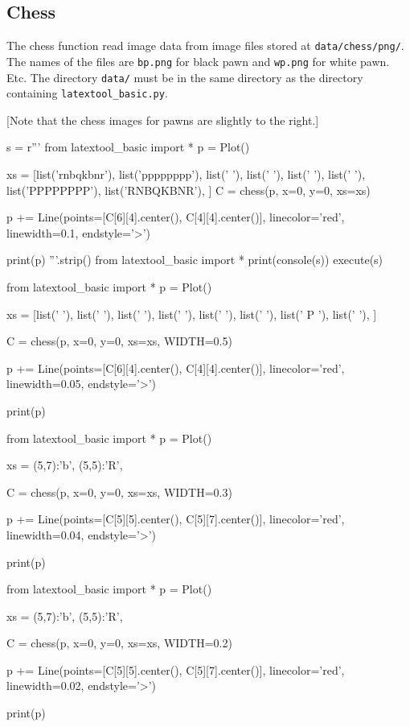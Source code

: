\subsection{Chess}

The chess function read image data from image files stored at
\verb!data/chess/png/!.
The names of the files are \verb!bp.png! for black pawn
and \verb!wp.png! for white pawn. Etc.
The directory \verb!data/! must be in the same directory as the directory
containing \verb!latextool_basic.py!.

[Note that the chess images for pawns are slightly to the right.]


\begin{python}
s = r'''
from latextool_basic import *
p = Plot()

xs = [list('rnbqkbnr'),
      list('pppppppp'),
      list('        '),
      list('        '),
      list('        '),
      list('        '),
      list('PPPPPPPP'),
      list('RNBQKBNR'),
      ]
C = chess(p, x=0, y=0, xs=xs)

p += Line(points=[C[6][4].center(), C[4][4].center()], linecolor='red',
          linewidth=0.1, endstyle='>')

print(p)
'''.strip()
from latextool_basic import *
print(console(s))
execute(s)
\end{python}



\begin{python}
from latextool_basic import *
p = Plot()

xs = [list('        '),
      list('        '),
      list('        '),
      list('        '),
      list('        '),
      list('        '),
      list('    P   '),
      list('        '),
      ]
      
C = chess(p, x=0, y=0, xs=xs, WIDTH=0.5)

p += Line(points=[C[6][4].center(), C[4][4].center()], linecolor='red',
          linewidth=0.05, endstyle='>')

print(p)
\end{python}


\begin{python}
from latextool_basic import *
p = Plot()

xs = {(5,7):'b',
      (5,5):'R',
      }
      
C = chess(p, x=0, y=0, xs=xs, WIDTH=0.3)

p += Line(points=[C[5][5].center(), C[5][7].center()], linecolor='red',
          linewidth=0.04, endstyle='>')

print(p)
\end{python}

\begin{python}
from latextool_basic import *
p = Plot()

xs = {(5,7):'b',
      (5,5):'R',
      }
      
C = chess(p, x=0, y=0, xs=xs, WIDTH=0.2)

p += Line(points=[C[5][5].center(), C[5][7].center()], linecolor='red',
          linewidth=0.02, endstyle='>')

print(p)
\end{python}
